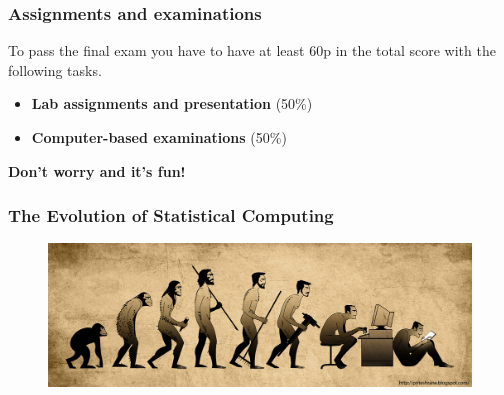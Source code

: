 \documentclass[10pt]{beamer}
\begin{document}
\begin{frame}
\frametitle{Assignments and examinations}

To pass the final exam you have to have at least 60p in the total score with
the following tasks.

  \begin{itemize}
  \item \textbf{Lab assignments and presentation} (50\%)


  \item \textbf{Computer-based examinations} (50\%)

 \end{itemize}
\end{frame}

\begin{frame}[plain]
  \addtocounter{framenumber}{-1}
  \begin{center}
    {\color{SUblue} \textbf{\Huge Don't worry and it's fun!}}
  \end{center}
\end{frame}


\begin{frame}
  \frametitle{The Evolution of Statistical Computing}

  \begin{figure}
    \centering
    \includegraphics[width=\textwidth]{evolution}
  \end{figure}

\end{frame}
\end{document}
